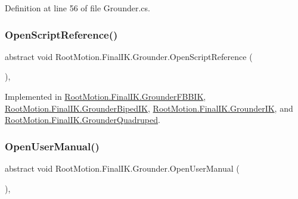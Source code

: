Definition at line 56 of file Grounder.\+cs.

\mbox{\label{class_root_motion_1_1_final_i_k_1_1_grounder_a76777e591f7aac441ea52b1b92c41886}} 
\subsubsection{\texorpdfstring{Open\+Script\+Reference()}{OpenScriptReference()}}
{\footnotesize\ttfamily abstract void Root\+Motion.\+Final\+I\+K.\+Grounder.\+Open\+Script\+Reference (\begin{DoxyParamCaption}{ }\end{DoxyParamCaption})\hspace{0.3cm}{\ttfamily [protected]}, {}}



Implemented in \mbox{\hyperlink{class_root_motion_1_1_final_i_k_1_1_grounder_f_b_b_i_k_a9440c51c4b8468067f83b465b005f0d8}{Root\+Motion.\+Final\+I\+K.\+Grounder\+F\+B\+B\+IK}}, \mbox{\hyperlink{class_root_motion_1_1_final_i_k_1_1_grounder_biped_i_k_a0a8d9d614597cfd77d596792f702b985}{Root\+Motion.\+Final\+I\+K.\+Grounder\+Biped\+IK}}, \mbox{\hyperlink{class_root_motion_1_1_final_i_k_1_1_grounder_i_k_ac89b8c0bc37e1832f962682d9655721c}{Root\+Motion.\+Final\+I\+K.\+Grounder\+IK}}, and \mbox{\hyperlink{class_root_motion_1_1_final_i_k_1_1_grounder_quadruped_ab5958dc0d24bb8a70d2a3ec4f3a7f433}{Root\+Motion.\+Final\+I\+K.\+Grounder\+Quadruped}}.

\mbox{\label{class_root_motion_1_1_final_i_k_1_1_grounder_af214d235ecea1b81ec637b1b61f756cb}} 
\subsubsection{\texorpdfstring{Open\+User\+Manual()}{OpenUserManual()}}
{\footnotesize\ttfamily abstract void Root\+Motion.\+Final\+I\+K.\+Grounder.\+Open\+User\+Manual (\begin{DoxyParamCaption}{ }\end{DoxyParamCaption})\hspace{0.3cm}{\ttfamily [protected]}, {}}



